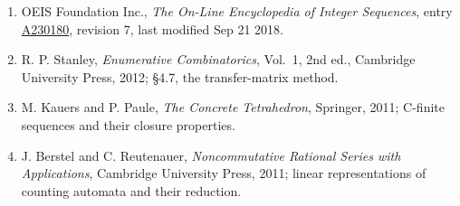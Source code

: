 \documentclass[11pt]{article}
\theoremstyle{definition}
\begin{document}
\begin{enumerate}

\item OEIS Foundation Inc., \emph{The On-Line Encyclopedia of Integer Sequences}, entry \href{https://oeis.org/A230180}{A230180}, revision 7, last modified Sep 21 2018.

\item R. P. Stanley, \emph{Enumerative Combinatorics}, Vol.~1, 2nd ed., Cambridge University Press, 2012; \S4.7, the transfer-matrix method.

\item M. Kauers and P. Paule, \emph{The Concrete Tetrahedron}, Springer, 2011; C-finite sequences and their closure properties.

\item J. Berstel and C. Reutenauer, \emph{Noncommutative Rational Series with Applications}, Cambridge University Press, 2011; linear representations of counting automata and their reduction.

\end{enumerate}
\end{document}
